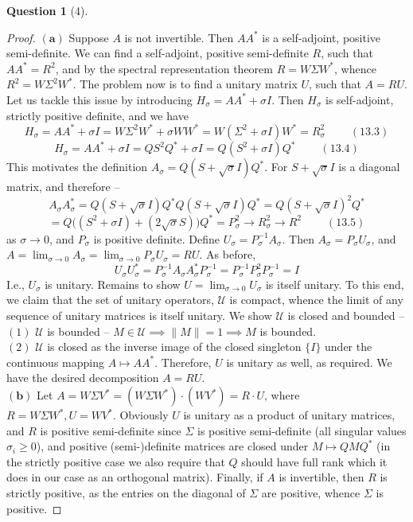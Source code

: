 \documentclass[11pt]{article}
\theoremstyle{quest}
\newtheorem*{question}{Question}
\begin{document}
\begin{question}[4]
\end{question}
\begin{proof}
$\mathbf{(a)}$ Suppose $A$ is not invertible. Then $AA^*$ is a self-adjoint, positive semi-definite. We can find a self-adjoint, positive semi-definite $R$, such that $AA^* = R^2$, and by the spectral representation theorem $R = W\Sigma W^*$, whence $R^2 = W\Sigma^2 W^*$. The problem now is to find a unitary matrix $U$, such that $A = RU$. Let us tackle this issue by introducing $H_{\sigma} = AA^* + \sigma I$. Then $H_{\sigma}$ is self-adjoint, strictly positive definite, and we have
$$H_{\sigma} = AA^* + \sigma I = W\Sigma^2 W^* + \sigma WW^* = W(\Sigma^2 + \sigma I)W^* = R_{\sigma}^2\ \ \ \ \ \ \ \ \ \ (13.3)$$
$$H_{\sigma} = AA^* + \sigma I = QS^2Q^* + \sigma I = Q(S^2 + \sigma I)Q^*\ \ \ \ \ \ \ \ \ \ (13.4)$$
This motivates the definition $A_{\sigma} = Q(S + \sqrt{\sigma} I)Q^*$. For $S + \sqrt{\sigma} I$ is a diagonal matrix, and therefore --
$$A_{\sigma}A_{\sigma}^* = Q(S + \sqrt{\sigma} I)Q^* Q(S + \sqrt{\sigma} I)Q^* = Q(S + \sqrt{\sigma} I)^2Q^*$$
$$= Q\big((S^2 + \sigma I) + (2\sqrt{\sigma}S)\big)Q^* = P_{\sigma}^2 \rightarrow R_{\sigma}^2 \rightarrow R^2\ \ \ \ \ \ \ \ \ \ (13.5)$$
as $\sigma \rightarrow 0$, and $P_{\sigma}$ is positive definite. Define $U_{\sigma} = P_{\sigma}^{-1}A_{\sigma}$. Then $A_{\sigma} = P_{\sigma}U_{\sigma}$, and $A = \lim_{\sigma \rightarrow 0} A_{\sigma} = \lim_{\sigma \rightarrow 0} P_{\sigma}U_{\sigma} = RU$. As before,
$$U_{\sigma} U_{\sigma}^* = P_{\sigma}^{-1}A_{\sigma} A_{\sigma}^* P_{\sigma}^{-1} = P_{\sigma}^{-1}P_{\sigma}^2 P_{\sigma}^{-1} = I$$
I.e., $U_{\sigma}$ is unitary. Remains to show $U = \lim_{\sigma \rightarrow 0}U_{\sigma}$ is itself unitary. To this end, we claim that the set of unitary operators, $\mathscr{U}$ is compact, whence the limit of any sequence of unitary matrices is itself unitary. We show $\mathscr{U}$ is closed and bounded --
\\$(1)$ $\mathscr{U}$ is bounded -- $M \in \mathscr{U} \implies \|M\| = 1 \implies M$ is bounded.
\\$(2)$ $\mathscr{U}$ is closed as the inverse image of the closed singleton $\{I\}$ under the continuous mapping $A \mapsto AA^*$.
Therefore, $U$ is unitary as well, as required. We have the desired decomposition $A = RU$.
\\$\mathbf{(b)}$ Let $A = W\Sigma V^* = (W \Sigma W^*) \cdot (WV^*) = R \cdot U$, where $R = W \Sigma W^*, U = WV^*$. Obviously $U$ is unitary as a product of unitary matrices, and $R$ is positive semi-definite since $\Sigma$ is positive semi-definite (all singular values $\sigma_i \ge 0$), and positive (semi-)definite matrices are closed under $M \mapsto QMQ^*$ (in the strictly positive case we also require that $Q$ should have full rank which it does in our case as an orthogonal matrix). Finally, if $A$ is invertible, then $R$ is strictly positive, as the entries on the diagonal of $\Sigma$ are positive, whence $\Sigma$ is positive.
\end{proof}
\end{document}
